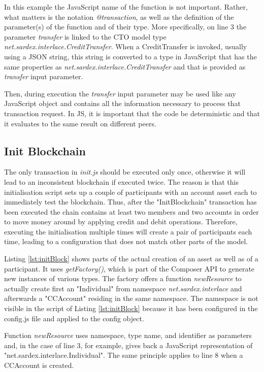 In this example the JavaScript name of the function is not important. Rather, what matters is the notation \textit{@transaction}, as well as the definition of the parameter(s) of the function and of their type. More specifically, on line 3 the parameter \textit{transfer} is linked to the CTO model type \textit{net.sardex.interlace.CreditTransfer}. When a CreditTransfer is invoked, usually using a JSON string, this string is converted to a type in JavaScript that has the same properties as \textit{net.sardex.interlace.CreditTransfer} and that is provided as \textit{transfer} input parameter.

Then, during execution the \textit{transfer} input parameter may be used like any JavaScript object and contains all the information necessary to process that transaction request. In JS, it is important that the code be deterministic and that it evaluates to the same result on different peers.

\subsection{Init Blockchain}

The only transaction in \textit{init.js} should be executed only once, otherwise it will lead to an inconsistent blockchain if executed twice. The reason is that this initialisation script sets up a couple of participants with an account asset each to immediately test the blockchain. Thus, after the "InitBlockchain" transaction has been executed the chain contains at least two members and two accounts in order to move money around by applying credit and debit operations. Therefore, executing the initialisation multiple times will create a pair of participants each time, leading to a configuration that does not match other parts of the model.

Listing \ref{lst:initBlock} shows parts of the actual creation of an asset as well as of a participant. It uses \textit{getFactory()}, which is part of the Composer API to generate new instances of various types. The factory offers a function \textit{newResource} to actually create first an "Individual" from namespace \textit{net.sardex.interlace} and afterwards a "CCAccount" residing in the same namespace. The namespace is not visible in the script of Listing \ref{lst:initBlock} because it has been configured in the config.js file and applied to the config object.

Function \textit{newResource} uses namespace, type name, and identifier as parameters and, in the case of line 3, for example, gives back a JavaScript representation of "net.sardex.interlace.Individual". The same principle applies to line 8 when a CCAccount is created.

